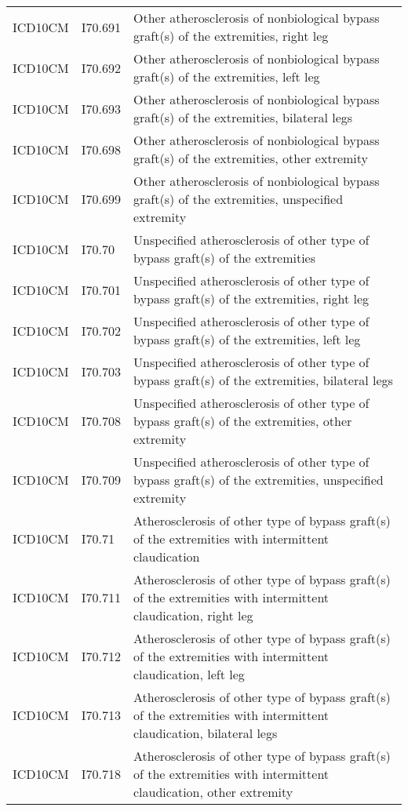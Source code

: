 \begin{longtable}{p{}p{}p{}}
  ICD10CM & I70.691 & Other atherosclerosis of nonbiological bypass graft(s) of the extremities, right leg \\ 
  ICD10CM & I70.692 & Other atherosclerosis of nonbiological bypass graft(s) of the extremities, left leg \\ 
  ICD10CM & I70.693 & Other atherosclerosis of nonbiological bypass graft(s) of the extremities, bilateral legs \\ 
  ICD10CM & I70.698 & Other atherosclerosis of nonbiological bypass graft(s) of the extremities, other extremity \\ 
  ICD10CM & I70.699 & Other atherosclerosis of nonbiological bypass graft(s) of the extremities, unspecified extremity \\ 
  ICD10CM & I70.70 & Unspecified atherosclerosis of other type of bypass graft(s) of the extremities \\ 
  ICD10CM & I70.701 & Unspecified atherosclerosis of other type of bypass graft(s) of the extremities, right leg \\ 
  ICD10CM & I70.702 & Unspecified atherosclerosis of other type of bypass graft(s) of the extremities, left leg \\ 
  ICD10CM & I70.703 & Unspecified atherosclerosis of other type of bypass graft(s) of the extremities, bilateral legs \\ 
  ICD10CM & I70.708 & Unspecified atherosclerosis of other type of bypass graft(s) of the extremities, other extremity \\ 
  ICD10CM & I70.709 & Unspecified atherosclerosis of other type of bypass graft(s) of the extremities, unspecified extremity \\ 
  ICD10CM & I70.71 & Atherosclerosis of other type of bypass graft(s) of the extremities with intermittent claudication \\ 
  ICD10CM & I70.711 & Atherosclerosis of other type of bypass graft(s) of the extremities with intermittent claudication, right leg \\ 
  ICD10CM & I70.712 & Atherosclerosis of other type of bypass graft(s) of the extremities with intermittent claudication, left leg \\ 
  ICD10CM & I70.713 & Atherosclerosis of other type of bypass graft(s) of the extremities with intermittent claudication, bilateral legs \\ 
  ICD10CM & I70.718 & Atherosclerosis of other type of bypass graft(s) of the extremities with intermittent claudication, other extremity \\ 

\end{longtable}
